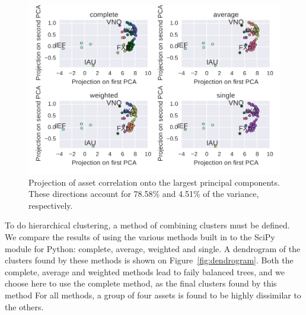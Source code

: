 \begin{figure}[tp]
\centering
\includegraphics{../pic/pca_methods.pdf}
\caption{Projection of asset correlation onto the largest principal components. These directions account for 78.58\% and 4.51\% of the variance, respectively.}
\label{fig:pca}
\end{figure}

To do hierarchical clustering, a method of combining clusters must be defined.
We compare the results of using the various methods built in to the SciPy module for Python: complete, average, weighted and single.
A dendrogram of the clusters found by these methods is shown on Figure~\ref{fig:dendrogram}.
Both the complete, average and weighted methods lead to faily balanced trees, and we choose here to use the complete method, as the final clusters found by this method
For all methods, a group of four assets is found to be highly dissimilar to the others.

